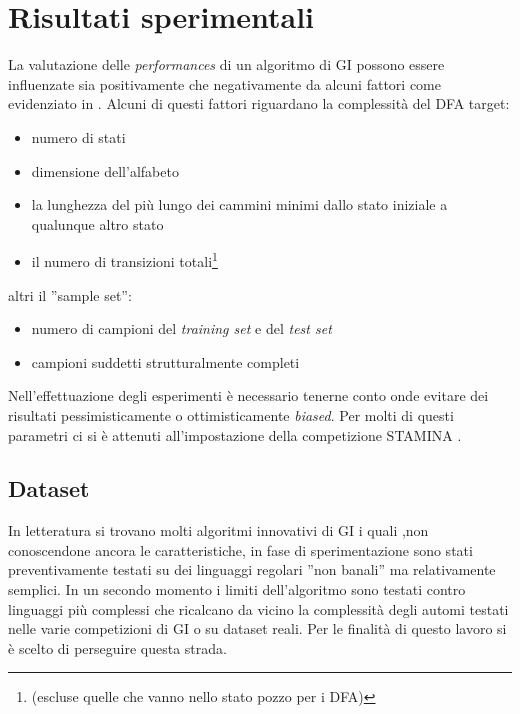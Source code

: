 
\chapter{Risultati sperimentali} %
\label{cap:sette}
La valutazione delle \textit{performances} di un algoritmo di \ac{GI} possono essere influenzate sia positivamente che negativamente da alcuni fattori come  evidenziato in \cite{Stamina10}. Alcuni di questi fattori riguardano la complessità del \ac{DFA} target:
\begin{itemize}
\item numero di stati
\item dimensione dell'alfabeto
\item la lunghezza del più lungo dei cammini minimi dallo stato iniziale a qualunque altro stato
\item il numero di transizioni totali\footnote{ (escluse quelle che vanno nello stato pozzo per i \ac{DFA})}
\end{itemize}

altri il ''sample set'':
\begin{itemize}
\item numero di campioni del \textit{training set} e del \textit{test set}
\item campioni suddetti strutturalmente completi
\end{itemize} 
Nell'effettuazione degli esperimenti è necessario tenerne conto onde evitare dei risultati pessimisticamente o ottimisticamente \textit{biased}. Per molti di questi parametri ci si è attenuti all'impostazione della competizione STAMINA \cite{Stamina10}.

\section{Dataset}
In letteratura si trovano molti algoritmi innovativi di \ac{GI} i quali ,non conoscendone ancora le caratteristiche, in fase di sperimentazione  sono stati preventivamente testati su dei linguaggi regolari ''non banali'' ma relativamente semplici. In un secondo momento i limiti dell'algoritmo sono testati contro linguaggi più complessi che ricalcano da vicino la complessità degli automi testati nelle varie competizioni di \ac{GI} o su dataset reali. Per le finalità di questo lavoro si è scelto di perseguire questa strada.

